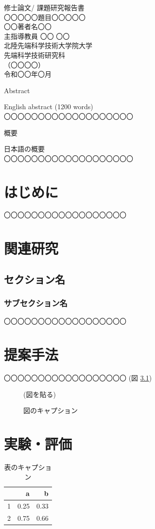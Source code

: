 \documentclass[12pt,a4j]{jreport}
\begin{document}
\thispagestyle{empty}
\begin{center}
修士論文/ 課題研究報告書\\%
\vfill
〇〇〇〇〇題目〇〇〇〇〇\\
\vfill
〇〇著者名〇〇\\
\vfill
主指導教員  〇〇 〇〇\\
\vfill
北陸先端科学技術大学院大学\\
先端科学技術研究科\\
（〇〇〇〇）\\ %
\vfill
令和〇〇年〇月\\ %
\vfill
\end{center}
\clearpage
\pagestyle{empty}
\centerline{Abstract}
English abstract (1200 words)\\
〇〇〇〇〇〇〇〇〇〇〇〇〇〇〇〇〇〇〇
\clearpage
\centerline{概要}
日本語の概要\\
〇〇〇〇〇〇〇〇〇〇〇〇〇〇〇〇〇〇〇

\clearpage\setcounter{page}{0}\pagestyle{plain}
\tableofcontents
\listoffigures
\listoftables
\clearpage\setcounter{page}{0}

\chapter{はじめに}
〇〇〇〇〇〇〇〇〇〇〇〇〇〇〇〇〇〇\cite{jref1,jref2,jref3}
\chapter{関連研究}
\section{セクション名}
\subsection{サブセクション名}
〇〇〇〇〇〇〇〇〇〇〇〇〇〇〇〇〇〇
\chapter{提案手法}
〇〇〇〇〇〇〇〇〇〇〇〇〇〇〇〇〇〇 (図 \ref{fig1})
\begin{figure}
\centering
(図を貼る)
\caption{図のキャプション}\label{fig1}
\end{figure}
\chapter{実験・評価}
\begin{table}
\centering
\caption{表のキャプション}\label{table1}
\begin{tabular}{r|rr}
& a & b\\ \hline
1& 0.25 & 0.33\\
2& 0.75 & 0.66\\
\end{tabular}
\end{table}
\end{document}
